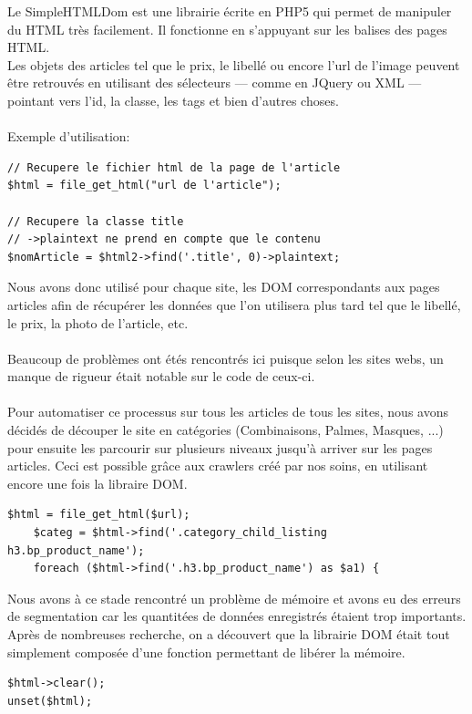 \documentclass{report}
\begin{document}
Le SimpleHTMLDom est une librairie écrite en PHP5 qui permet de manipuler du HTML très facilement. Il fonctionne en s'appuyant sur les balises des pages HTML.\\
Les objets des articles tel que le prix, le libellé ou encore l'url de l'image peuvent être retrouvés en utilisant des sélecteurs — comme en JQuery ou XML — pointant vers l'id, la classe, les tags et bien d'autres choses.\\\\
Exemple d'utilisation: \\
\begin{lstlisting}
// Recupere le fichier html de la page de l'article
$html = file_get_html("url de l'article");

// Recupere la classe title
// ->plaintext ne prend en compte que le contenu
$nomArticle = $html2->find('.title', 0)->plaintext;
\end{lstlisting}

Nous avons donc utilisé pour chaque site, les DOM correspondants aux pages articles afin de récupérer les données que l'on utilisera plus tard tel que le libellé, le prix, la photo de l'article, etc.\\\\
Beaucoup de problèmes ont étés rencontrés ici puisque selon les sites webs, un manque de rigueur était notable sur le code de ceux-ci.\\\\
Pour automatiser ce processus sur tous les articles de tous les sites, nous avons décidés de découper le site en catégories (Combinaisons, Palmes, Masques, ...) pour ensuite les parcourir sur plusieurs niveaux jusqu'à arriver sur les pages articles. Ceci est possible grâce aux crawlers créé par nos soins, en utilisant encore une fois la libraire DOM.
\begin{lstlisting}
$html = file_get_html($url);
	$categ = $html->find('.category_child_listing h3.bp_product_name');
	foreach ($html->find('.h3.bp_product_name') as $a1) {
\end{lstlisting}

Nous avons à ce stade rencontré un problème de mémoire et avons eu des erreurs de segmentation car les quantitées de données enregistrés étaient trop importants. Après de nombreuses recherche, on a découvert que la librairie DOM était tout simplement composée d'une fonction permettant de libérer la mémoire.
\begin{lstlisting}
$html->clear();
unset($html);
\end{lstlisting}
\end{document}
